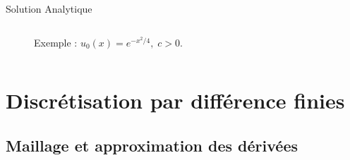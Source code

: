\documentclass[aspectratio=169, french]{beamer}
\begin{document}
\begin{frame}{Solution Analytique}
\begin{columns}
\begin{column}{.42\textwidth}
\begin{overlayarea}{\textwidth}{\textheight}
\begin{figure}[t]
{				\caption*{Exemple : $u_0(x) = e^{-x^2/4}, \; c>0$.}
			}
		\end{figure}
		\end{overlayarea}
	\end{column}
\end{columns}


\end{frame}

\section{Discrétisation par différence finies}

\subsection{Maillage et approximation des dérivées}
\end{document}
